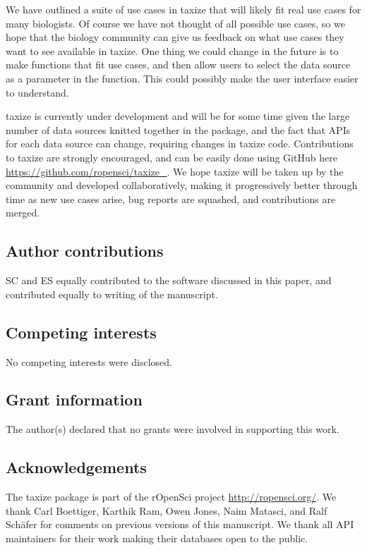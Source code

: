 \documentclass[10pt,a4paper,twocolumn]{article}
\begin{document}
We have outlined a suite of use cases in taxize that will likely fit real use cases for many biologists. Of course we have not thought of all possible use cases, so we hope that the biology community can give us feedback on what use cases they want to see available in taxize. One thing we could change in the future is to make functions that fit use cases, and then allow users to select the data source as a parameter in the function. This could possibly make the user interface easier to understand.

taxize is currently under development and will be for some time given the large number of data sources knitted together in the package, and the fact that APIs for each data source can change, requiring changes in taxize code. Contributions to taxize are strongly encouraged, and can be easily done using GitHub here \url{https://github.com/ropensci/taxize_}. We hope taxize will be taken up by the community and developed collaboratively, making it progressively better through time as new use cases arise, bug reports are squashed, and contributions are merged.


\subsection*{Author contributions}
SC and ES equally contributed to the software discussed in this paper, and contributed equally to writing of the manuscript. 

\subsection*{Competing interests}
No competing interests were disclosed.

\subsection*{Grant information}
The author(s) declared that no grants were involved in supporting this work.

\subsection*{Acknowledgements}
The taxize package is part of the rOpenSci project \url{http://ropensci.org/}. We thank Carl Boettiger, Karthik Ram, Owen Jones, Naim Matasci, and Ralf Sch\"{a}fer for comments on previous versions of this manuscript. We thank all API maintainers for their work making their databases open to the public.


\nocite{*}
{\small
}
\end{document}
